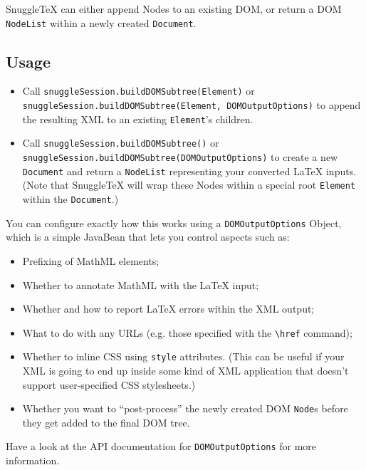 
SnuggleTeX can either append Nodes to an existing DOM, or return a DOM
\verb|NodeList| within a newly created \verb|Document|.

\subsection*{Usage}

\begin{itemize}
  \item
    Call \verb|snuggleSession.buildDOMSubtree(Element)|
    or \verb|snuggleSession.buildDOMSubtree(Element, DOMOutputOptions)|
    to append the resulting XML to an existing \verb|Element|'s children.

  \item
    Call \verb|snuggleSession.buildDOMSubtree()|
    or \verb|snuggleSession.buildDOMSubtree(DOMOutputOptions)|
    to create a new \verb|Document| and return a \verb|NodeList| representing
    your converted LaTeX inputs. (Note that SnuggleTeX will wrap these Nodes
    within a special root \verb|Element| within the \verb|Document|.)
\end{itemize}

You can configure exactly how this works using a \verb|DOMOutputOptions| Object,
which is a simple JavaBean that lets you control aspects such as:

\begin{itemize}
  \item Prefixing of MathML elements;
  \item Whether to annotate MathML with the LaTeX input;
  \item Whether and how to report LaTeX errors within the XML output;
  \item What to do with any URLs (e.g. those specified with the \verb|\href| command);
  \item Whether to inline CSS using \verb|style| attributes. (This can be useful if your XML
    is going to end up inside some kind of XML application that doesn't support user-specified
    CSS stylesheets.)
  \item Whether you want to ``post-process'' the newly created DOM \verb|Node|s before they get
    added to the final DOM tree.
\end{itemize}

Have a look at the API documentation for \verb|DOMOutputOptions| for more information.

